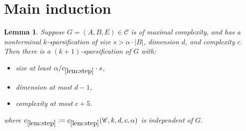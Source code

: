 \documentclass[11pt]{article}
\newtheorem{lemma}{Lemma}
\theoremstyle{definition}
\newcommand{\CC}{{\mathscr C}}
\begin{document}
\section{Main induction}
\begin{lemma}\label{lem:step}
  Suppose $G=(A,B,E) \in \CC$ is of maximal complexity, and has a nonterminal $k$-sparsification of size $s > \alpha \cdot |B|$,
  dimension $d$, and complexity $c$.
  Then there is a $(k+1)$-sparsification of $G$ with:
  \begin{itemize}
    \item size at least $\alpha /c_{\ref{lem:step}} \cdot s$,
    \item dimension at most $d-1$,
    \item complexity at most $c+5$.
  \end{itemize}
  where $c_{\ref{lem:step}} := c_{\ref{lem:step}}(\CC, k, d, c, \alpha)$ is independent of $G$.
\end{lemma}
\end{document}
